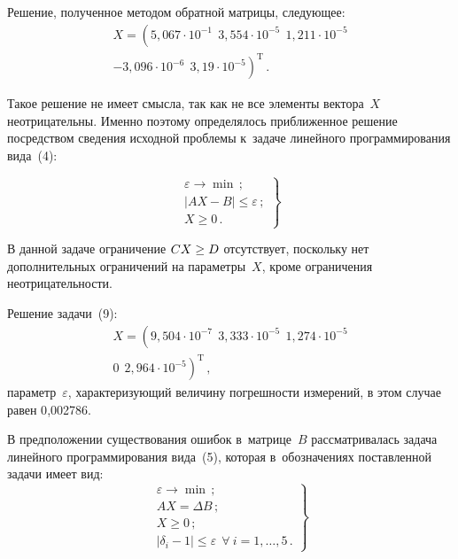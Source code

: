 \begin{multicols}{2}
  Решение, полученное методом обратной матрицы, следующее:
 \begin{multline*}
  X=\left( 5{,}067\cdot 10^{-1}\ \ 3{,}554\cdot 10^{-5}\ \
  1{,}211\cdot 10^{-5}\right.\\
\left.-3{,}096\cdot 10^{-6}\ \ 3{,}19\cdot 10^{-5}\right)^{\mathrm{T}}\,.
  \end{multline*}

  Такое решение не имеет смысла, так как не все элементы вектора~$X$
неотрицательны. Именно поэтому определялось приближенное решение
посредством сведения исходной проблемы к~задаче линейного
программирования вида~(4):

\noindent
  \begin{equation}
  \left.
  \begin{array}{c} \varepsilon\to \min\,;\\[6pt]
  \vert AX-B\vert \leq \varepsilon\,;\\[6pt]
  X\geq 0\,.
  \end{array}
  \right\}
  \label{e9-spi}
  \end{equation}

  В данной задаче ограничение $CX\hm \geq D$ отсутствует, поскольку нет
дополнительных ограничений на параметры~$X$, кроме ограничения
неотрицательности.

  Решение задачи~(9):
  \begin{multline*}
  X=\left( 9{,}504\cdot 10^{-7}\ \ 3{,}333\cdot 10^{-5}\ \
  1{,}274\cdot 10^{-5}\right.\\
\left.0\  \ 2{,}964\cdot 10^{-5}\right)^{\mathrm{T}}\,,
  \end{multline*}
  параметр~$\varepsilon$, характеризующий величину погреш\-ности измерений,
в этом случае равен 0{,}002786.

  В предположении существования ошибок в~мат\-ри\-це~$B$ рассматривалась
задача линейного программирования вида~(5), которая в~обозначениях
по\-став\-лен\-ной задачи имеет вид:
  \begin{equation}
  \left.
  \begin{array}{c}
  \varepsilon\to \min\,;\\[6pt]
  AX=\Delta B\,;\\[6pt]
  X\geq 0\,;\\[6pt]
  \left\vert \delta_i-1\right\vert \leq \varepsilon\ \  \forall\ i=1,\ldots, 5\,.
  \end{array}
  \right\}
  \label{e10-spi}
  \end{equation}


\end{multicols}
